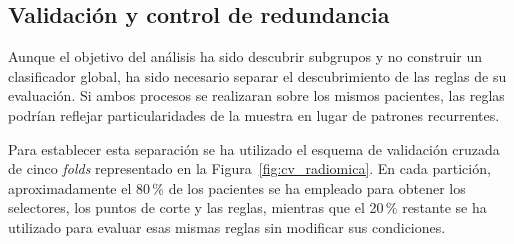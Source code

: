 

\subsection{Validación y control de redundancia}

Aunque el objetivo del análisis ha sido descubrir subgrupos y no construir un clasificador global, ha sido necesario separar el descubrimiento de las reglas de su evaluación. Si ambos procesos se realizaran sobre los mismos pacientes, las reglas podrían reflejar particularidades de la muestra en lugar de patrones recurrentes.

Para establecer esta separación se ha utilizado el esquema de validación cruzada de cinco \textit{folds} representado en la Figura~\ref{fig:cv_radiomica}. En cada partición, aproximadamente el 80\,\% de los pacientes se ha empleado para obtener los selectores, los puntos de corte y las reglas, mientras que el 20\,\% restante se ha utilizado para evaluar esas mismas reglas sin modificar sus condiciones.

